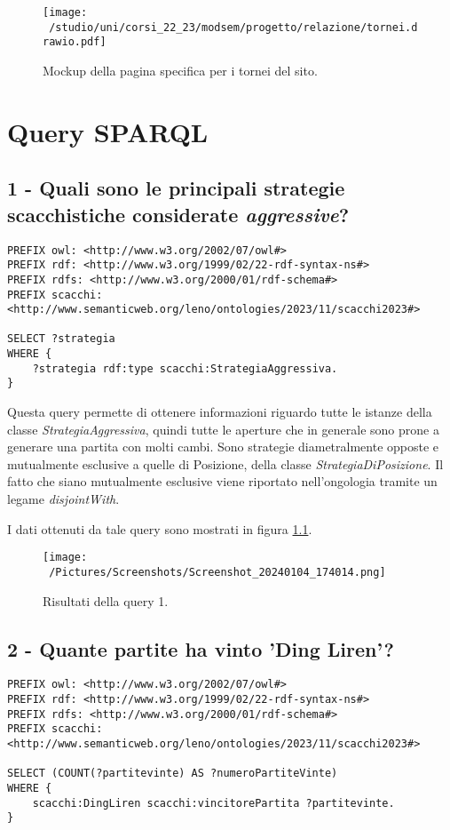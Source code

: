 \documentclass[12pt]{book}
\begin{document}
\begin{figure}[h]
  \caption{Mockup della pagina specifica per i tornei del sito.}
  \centering
\label{fig:tornei}
  \texttt{[image: ~/studio/uni/corsi\_22\_23/modsem/progetto/relazione/tornei.drawio.pdf]}
\end{figure} 

\chapter{Query SPARQL}

\section{1 - Quali sono le principali strategie scacchistiche considerate
\textit{aggressive}?}

\begin{verbatim}
PREFIX owl: <http://www.w3.org/2002/07/owl#>
PREFIX rdf: <http://www.w3.org/1999/02/22-rdf-syntax-ns#>
PREFIX rdfs: <http://www.w3.org/2000/01/rdf-schema#>
PREFIX scacchi: <http://www.semanticweb.org/leno/ontologies/2023/11/scacchi2023#>

SELECT ?strategia
WHERE {
    ?strategia rdf:type scacchi:StrategiaAggressiva.
}
\end{verbatim}

Questa query permette di ottenere informazioni riguardo tutte le
istanze della classe \textit{StrategiaAggressiva}, quindi tutte le
aperture che in generale sono prone a generare una partita con molti
cambi. Sono strategie diametralmente opposte e mutualmente esclusive a
quelle di Posizione, della classe \textit{StrategiaDiPosizione}. Il
fatto che siano mutualmente esclusive viene riportato nell'ongologia
tramite un legame \textit{disjointWith}.

I dati ottenuti da tale query sono mostrati in figura \ref{fig:query1}.

\begin{figure}[h]
  \caption{Risultati della query 1.}
  \centering
  \label{fig:query1}
  \texttt{[image: ~/Pictures/Screenshots/Screenshot\_20240104\_174014.png]}
\end{figure} 

\section{2 - Quante partite ha vinto 'Ding Liren'?}

\begin{verbatim}
PREFIX owl: <http://www.w3.org/2002/07/owl#>
PREFIX rdf: <http://www.w3.org/1999/02/22-rdf-syntax-ns#>
PREFIX rdfs: <http://www.w3.org/2000/01/rdf-schema#>
PREFIX scacchi: <http://www.semanticweb.org/leno/ontologies/2023/11/scacchi2023#>

SELECT (COUNT(?partitevinte) AS ?numeroPartiteVinte)
WHERE {
    scacchi:DingLiren scacchi:vincitorePartita ?partitevinte.
}
\end{verbatim}
\end{document}
